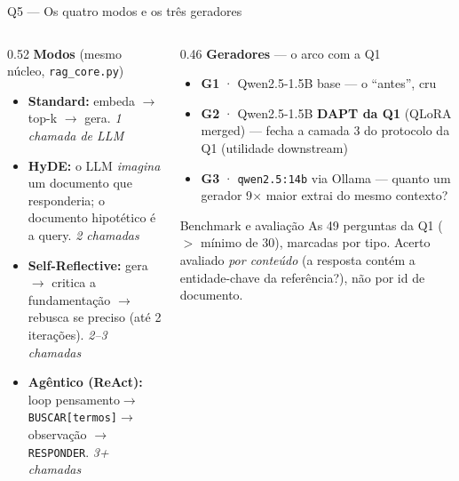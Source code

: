 \documentclass[10pt,aspectratio=169]{beamer}
\begin{document}
\begin{frame}{Q5 — Os quatro modos e os três geradores}
  \begin{columns}[T]
    \begin{column}{0.52\textwidth}
      \textbf{Modos} (mesmo núcleo, \texttt{rag\_core.py})
      \begin{itemize}\small
        \item \textbf{Standard:} embeda $\to$ top-k $\to$ gera. \emph{1 chamada de LLM}
        \item \textbf{HyDE:} o LLM \emph{imagina} um documento que responderia; o documento hipotético
          é a query. \emph{2 chamadas}
        \item \textbf{Self-Reflective:} gera $\to$ critica a fundamentação $\to$ rebusca se preciso
          (até 2 iterações). \emph{2--3 chamadas}
        \item \textbf{Agêntico (ReAct):} loop pensamento$\to$\texttt{BUSCAR[termos]}$\to$observação
          $\to$\texttt{RESPONDER}. \emph{3+ chamadas}
      \end{itemize}
    \end{column}
    \begin{column}{0.46\textwidth}
      \textbf{Geradores} — o arco com a Q1
      \begin{itemize}\small
        \item \textbf{G1} · Qwen2.5-1.5B base — o ``antes'', cru
        \item \textbf{G2} · Qwen2.5-1.5B \textbf{DAPT da Q1} (QLoRA merged) — fecha a camada 3 do
          protocolo da Q1 (utilidade downstream)
        \item \textbf{G3} · \texttt{qwen2.5:14b} via Ollama — quanto um gerador 9$\times$ maior
          extrai do mesmo contexto?
      \end{itemize}
      \begin{block}{\small Benchmark e avaliação}
        \small As 49 perguntas da Q1 ($>$ mínimo de 30), marcadas por tipo. Acerto avaliado
        \emph{por conteúdo} (a resposta contém a entidade-chave da referência?), não por id de
        documento.
      \end{block}
    \end{column}
  \end{columns}
\end{frame}
\end{document}
